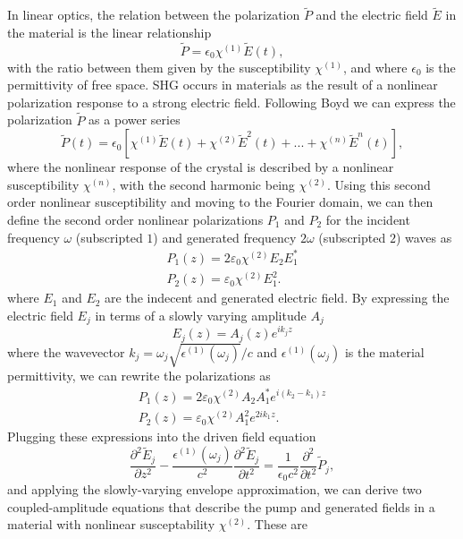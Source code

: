 \documentclass[9pt,twocolumn,twoside]{pnas-new}
\begin{document}
In linear optics, the relation between the polarization $\tilde{P}$ and the electric field $\tilde{E}$ in the material is the linear relationship
\begin{equation*}
	\tilde{P} = \epsilon_0 \chi^{(1)} \tilde{E}(t),
\end{equation*}
with the ratio between them given by the susceptibility $\chi^{(1)}$, and where $\epsilon_0$ is the permittivity of free space. SHG occurs in materials as the result of a nonlinear polarization response to a strong electric field. Following Boyd \cite{Boyd2008} we can express the polarization $\tilde{P}$ as a power series
\begin{equation*}
	\tilde{P}(t) = \epsilon_0 \left[ \chi^{(1)} \tilde{E}(t) + \chi^{(2)} \tilde{E}^2(t) + ... + \chi^{(n)} \tilde{E}^n(t) \right],
\end{equation*}
where the nonlinear response of the crystal is described by a nonlinear susceptibility $\chi^{(n)}$, with the second harmonic being $\chi^{(2)}$. Using this second order nonlinear susceptibility and moving to the Fourier domain, we can then define the second order nonlinear polarizations $P_1$ and $P_2$ for the incident frequency $\omega$ (subscripted $1$) and generated frequency $2\omega$ (subscripted $2$) waves as
\begin{gather*}
	P_1(z) = 2 \varepsilon_0 \chi^{(2)} E_2 E_1^\ast \\
	P_2(z) = \varepsilon_0 \chi^{(2)} E_1^2.
\end{gather*}
where $E_1$ and $E_2$ are the indecent and generated electric field. By expressing the electric field $E_j$ in terms of a slowly varying amplitude $A_j$
\begin{equation*}
	E_j(z) = A_j(z)e^{i k_j z}
\end{equation*}
where the wavevector $k_j = \omega_j \sqrt{\epsilon^{(1)}( \omega_j )} / c$ and $\epsilon^{(1)}( \omega_j )$ is the material permittivity, we can rewrite the polarizations as
\begin{gather*}
	P_1(z) = 2 \varepsilon_0 \chi^{(2)} A_2 A_1^\ast e^{i(k_2-k_1)z} \\
	P_2(z) = \varepsilon_0 \chi^{(2)} A_1^2 e^{2 i k_1 z}.
\end{gather*}
Plugging these expressions into the driven field equation
$$
	\frac{\partial^2 \tilde{E}_j}{\partial z^2} - \frac{\epsilon^{(1)}(\omega_j)}{c^2}\frac{\partial^2 \tilde{E}_j}{\partial t^2} = \frac{1}{\epsilon_0 c^2}\frac{\partial^2}{\partial t^2}\tilde{P}_j,
$$
and applying the slowly-varying envelope approximation, we can derive two coupled-amplitude equations that describe the pump and generated fields in a material with nonlinear susceptability $\chi^{(2)}$. These are
\end{document}
